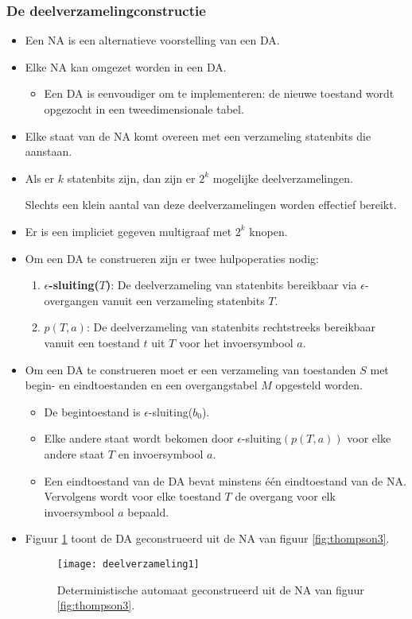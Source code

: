 \subsubsection{De deelverzamelingconstructie}
\begin{itemize}
    \item Een NA is een alternatieve voorstelling van een DA.
    \item Elke NA kan omgezet worden in een DA.
    \begin{itemize}
        \item Een DA is eenvoudiger om te implementeren: de nieuwe toestand wordt opgezocht in een tweedimensionale tabel.
    \end{itemize}
    \item Elke staat van de NA komt overeen met een verzameling statenbits die aanstaan.
    \item Als er $k$ statenbits zijn, dan zijn er $2^k$ mogelijke deelverzamelingen.
    \begin{itemize}
        \good Slechts een klein aantal van deze deelverzamelingen worden effectief bereikt.
    \end{itemize}
    \item Er is een impliciet gegeven multigraaf met $2^k$ knopen.
    \item Om een DA te construeren zijn er twee hulpoperaties nodig:
    \begin{enumerate}
        \item \textbf{$\epsilon$-sluiting($T$)}: De deelverzameling van statenbits bereikbaar via $\epsilon$-overgangen vanuit een verzameling statenbits $T$.
        \item \textbf{$p(T, a)$}: De deelverzameling van statenbits rechtstreeks bereikbaar vanuit een toestand $t$ uit $T$ voor het invoersymbool $a$.
    \end{enumerate}
    \item Om een DA te construeren moet er een verzameling van toestanden $S$ met begin- en eindtoestanden en een overgangstabel $M$ opgesteld worden.
    \begin{itemize}
        \item De begintoestand is $\epsilon$-sluiting($b_0$).
        \item Elke andere staat wordt bekomen door $\epsilon$-sluiting$(p(T, a))$ voor elke andere staat $T$ en invoersymbool $a$.
        \item Een eindtoestand van de DA bevat minstens één eindtoestand van de NA.
        Vervolgens wordt voor elke toestand $T$ de overgang voor elk invoersymbool $a$ bepaald.
    \end{itemize}
    \item Figuur \ref{fig:deelverzameling1} toont de DA geconstrueerd uit de NA van figuur \ref{fig:thompson3}.
    \begin{figure}[ht]
        \centering
        \texttt{[image: deelverzameling1]}
        \caption{Deterministische automaat geconstrueerd uit de NA van figuur \ref{fig:thompson3}.}
        \label{fig:deelverzameling1}
    \end{figure}
\end{itemize}

